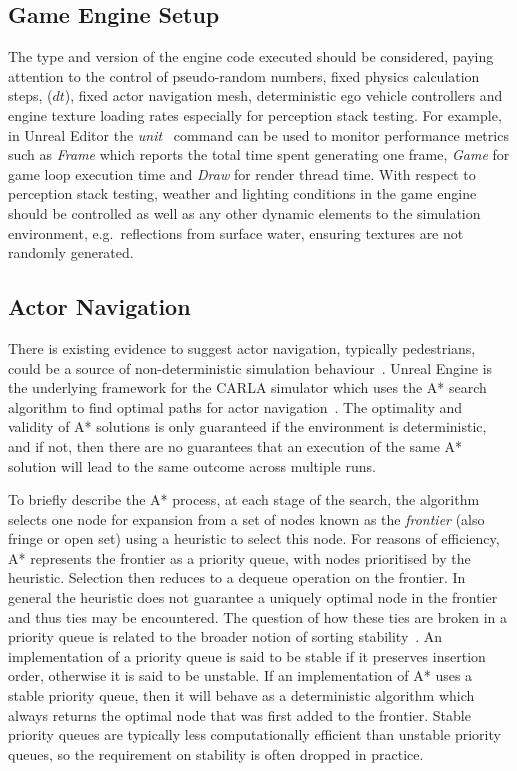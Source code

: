 \subsection{Game Engine Setup}
The type and version of the engine code executed should be considered, paying attention to the control of pseudo-random numbers, fixed physics calculation steps, ($dt$), fixed actor navigation mesh, deterministic ego vehicle controllers and engine texture loading rates especially for perception stack testing. 
%
For example, in Unreal Editor the \textit{unit}~\cite{stat_commands} command can be used to monitor performance metrics such as \textit{Frame} which reports the total time spent generating one frame, \textit{Game} for game loop execution time and \textit{Draw} for render thread time. 
%
With respect to perception stack testing, weather and lighting conditions in the game engine should be controlled as well as any other dynamic elements to the simulation environment, e.g.\ reflections from surface water, ensuring textures are not randomly generated. 

\subsection{Actor Navigation}
There is existing evidence to suggest actor navigation, typically pedestrians, could be a source of non-deterministic simulation behaviour~\cite{CARLABenchmark}. Unreal Engine is the underlying framework for the CARLA simulator which uses the A* search algorithm to find optimal paths for actor navigation~\cite{newton2016unreal}. The optimality and validity of A* solutions is only guaranteed if the environment is deterministic, and if not, then there are no guarantees that an execution of the same A* solution will lead to the same outcome across multiple runs. 

To briefly describe the A* process, at each stage of the search, the algorithm selects one node for expansion from a set of nodes known as the \textit{frontier} (also fringe or open set) using a heuristic to select this node. For reasons of efficiency, A* represents the frontier as a priority queue, with nodes prioritised by the heuristic. Selection then reduces to a dequeue operation on the frontier. In general the heuristic does not guarantee a uniquely optimal node in the frontier and thus ties may be encountered. The question of how these ties are broken in a priority queue is related to the broader notion of sorting stability~\cite{Sedgewick2011}. An implementation of a priority queue is said to be stable if it preserves insertion order, otherwise it is said to be unstable. If an implementation of A* uses a stable priority queue, then it will behave as a deterministic algorithm which always returns the optimal node that was first added to the frontier. Stable priority queues are typically less computationally efficient than unstable priority queues, so the requirement on stability is often dropped in practice. 

